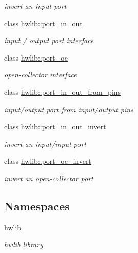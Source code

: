 \begin{DoxyCompactItemize}
\begin{DoxyCompactList}\small\item\em invert an input port \end{DoxyCompactList}\item 
class \hyperlink{classhwlib_1_1port__in__out}{hwlib\+::port\+\_\+in\+\_\+out}
\begin{DoxyCompactList}\small\item\em input / output port interface \end{DoxyCompactList}\item 
class \hyperlink{classhwlib_1_1port__oc}{hwlib\+::port\+\_\+oc}
\begin{DoxyCompactList}\small\item\em open-\/collector interface \end{DoxyCompactList}\item 
class \hyperlink{classhwlib_1_1port__in__out__from__pins}{hwlib\+::port\+\_\+in\+\_\+out\+\_\+from\+\_\+pins}
\begin{DoxyCompactList}\small\item\em input/output port from input/output pins \end{DoxyCompactList}\item 
class \hyperlink{classhwlib_1_1port__in__out__invert}{hwlib\+::port\+\_\+in\+\_\+out\+\_\+invert}
\begin{DoxyCompactList}\small\item\em invert an input/input port \end{DoxyCompactList}\item 
class \hyperlink{classhwlib_1_1port__oc__invert}{hwlib\+::port\+\_\+oc\+\_\+invert}
\begin{DoxyCompactList}\small\item\em invert an open-\/collector port \end{DoxyCompactList}\end{DoxyCompactItemize}
\subsection*{Namespaces}
\begin{DoxyCompactItemize}
\item 
 \hyperlink{namespacehwlib}{hwlib}
\begin{DoxyCompactList}\small\item\em hwlib library \end{DoxyCompactList}\end{DoxyCompactItemize}

